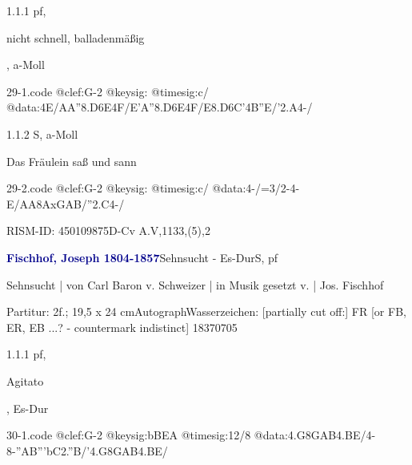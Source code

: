 \documentclass[a4paper, twocolumn, 11pt]{book}
\begin{document}
\par 1.1.1  pf, \begin{itshape}nicht schnell, balladenmäßig\end{itshape}, a-Moll  
\begin{filecontents*}{29-1.code}
@clef:G-2
@keysig:
@timesig:c/
@data:4E/AA''{8.D6E}4F/E'A''{8.D6E}4F/E{8.D6C}'4B''E/'2.A4-/
\end{filecontents*}
\newline %
\par 1.1.2  S, a-Moll\newline \begin{footnotesize} Das Fräulein saß und sann \end{footnotesize}  
\begin{filecontents*}{29-2.code}
@clef:G-2
@keysig:
@timesig:c/
@data:4-/=3/2-4-E/AA{8AxG}{AB}/''2.C4-/
\end{filecontents*}
\newline %
\par RISM-ID: 450109875\newline D-Cv  A.V,1133,(5),2
\par \vspace{16pt} \textcolor{darkblue}{\textbf{Fischhof, Joseph  1804-1857}}\hfillplus{[30]}\newline Sehnsucht - Es-Dur\newline S, pf
\par \begin{itshape} Sehnsucht | von Carl Baron v. Schweizer | in Musik gesetzt v. | Jos. Fischhof\end{itshape} 
\par \textcolor{darkblue}{}  Partitur: 2f.; 19,5 x 24 cm\newline Autograph\newline Wasserzeichen: [partially cut off:] FR [or FB, ER, EB ...? - countermark indistinct]  18370705
\par 1.1.1  pf, \begin{itshape}Agitato\end{itshape}, Es-Dur  
\begin{filecontents*}{30-1.code}
@clef:G-2
@keysig:bBEA
@timesig:12/8
@data:4.G8{GAB}4.BE/4-8-{''AB'''bC}2.''B/'4.G8{GAB}4.BE/
\end{filecontents*}
\end{document}
